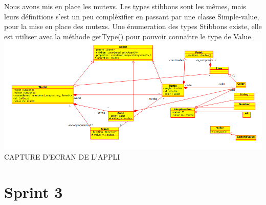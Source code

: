 Nous avons mis en place les mutexs.
Les types stibbons sont les mêmes, mais leurs définitions s'est un peu compléxifier en passant par une classe Simple-value, pour la mise en place des mutexs. Une énumeration des types Stibbons existe, elle est utiliser avec la méthode getType() pour pouvoir connaître le type de Value.\\
\includegraphics[scale=0.4]{doc/report/uml/v02reel.png}
CAPTURE D'ECRAN DE L'APPLI

\section{Sprint 3}


